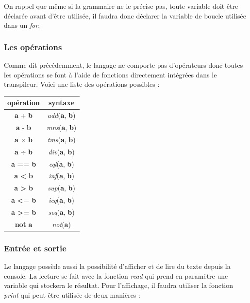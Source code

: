 \documentclass[a4paper]{article}%
\begin{document}
On rappel que même si la grammaire ne le précise pas, toute variable doit être
déclarée avant d'être utilisée, il faudra donc déclarer la variable de boucle
utilisée dans un \textit{for}.

\subsubsection*{Les opérations}
\label{sec:operator}

Comme dit précédemment, le langage ne comporte pas d'opérateurs donc toutes
les opérations se font à l'aide de fonctions directement intégrées dans le
transpileur. Voici une liste des opérations possibles :

\begin{center}
\begin{tabular}{ | c | c | }
    \hline
    opération & syntaxe\\
    \hline
    \textbf{a} + \textbf{b} & \textit{add}(\textbf{a}, \textbf{b})\\
    \hline
    \textbf{a} - \textbf{b} & \textit{mns}(\textbf{a}, \textbf{b})\\
    \hline
    \textbf{a} $\times$ \textbf{b} & \textit{tms}(\textbf{a}, \textbf{b})\\
    \hline
    \textbf{a} $\div$ \textbf{b} & \textit{div}(\textbf{a}, \textbf{b})\\
    \hline
    \textbf{a} \textbf{==} \textbf{b} & \textit{eql}(\textbf{a}, \textbf{b})\\
    \hline
    \textbf{a} \textbf{<} \textbf{b} & \textit{inf}(\textbf{a}, \textbf{b})\\
    \hline
    \textbf{a} \textbf{>} \textbf{b} & \textit{sup}(\textbf{a}, \textbf{b})\\
    \hline
    \textbf{a} \textbf{<=} \textbf{b} & \textit{ieq}(\textbf{a}, \textbf{b})\\
    \hline
    \textbf{a} \textbf{>=} \textbf{b} & \textit{seq}(\textbf{a}, \textbf{b})\\
    \hline
    \textbf{not} \textbf{a} & \textit{not}(\textbf{a})\\
    \hline
\end{tabular}
\end{center}

\subsubsection*{Entrée et sortie}

Le langage possède aussi la possibilité d'afficher et de lire du texte depuis la
console. La lecture se fait avec la fonction \textit{read} qui prend en
paramètre une variable qui stockera le résultat. Pour l'affichage, il faudra
utiliser la fonction \textit{print} qui peut être utilisée de deux manières :
\end{document}

